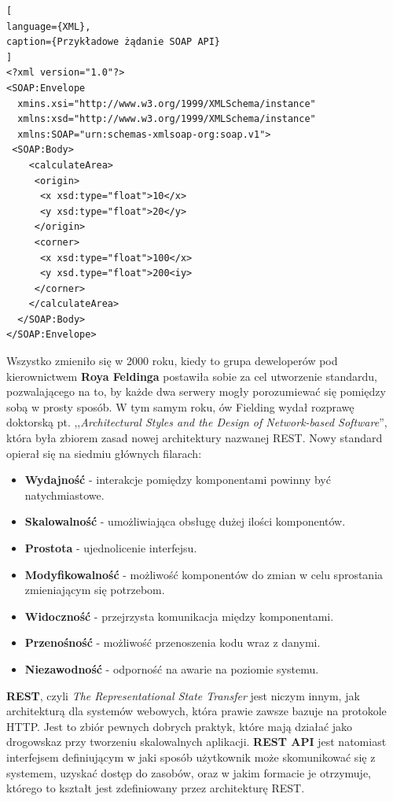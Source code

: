 \documentclass[oneside,polski,logo,indent]{amuthesis}
\begin{document}
\begin{lstlisting}[
language={XML},
caption={Przykładowe żądanie SOAP API}
]
<?xml version="1.0"?>
<SOAP:Envelope 
  xmins.xsi="http://www.w3.org/1999/XMLSchema/instance" 
  xmlns:xsd="http://www.w3.org/1999/XMLSchema/instance" 
  xmlns:SOAP="urn:schemas-xmlsoap-org:soap.v1">
 <SOAP:Body>
    <calculateArea>
     <origin>
      <x xsd:type="float">10</x>
      <y xsd:type="float">20</y>
     </origin>
     <corner>
      <x xsd:type="float">100</x>
      <y xsd.type="float">200<iy>
     </corner>
    </calculateArea>
  </SOAP:Body>
</SOAP:Envelope>
\end{lstlisting}


Wszystko zmieniło się w 2000 roku, kiedy to grupa deweloperów pod kierownictwem \textbf{Roya Feldinga} postawiła sobie za cel utworzenie standardu, pozwalającego na to, by każde dwa serwery mogły porozumiewać się pomiędzy sobą w prosty sposób. W tym samym roku, ów Fielding wydał rozprawę doktorską pt. ,,\emph{Architectural Styles and the Design of Network-based Software}'', która była zbiorem zasad nowej architektury nazwanej REST. Nowy standard opierał się na siedmiu głównych filarach:\newline 
\begin{itemize}
\item \textbf{Wydajność} - interakcje pomiędzy komponentami powinny być natychmiastowe.\newline
\item \textbf{Skalowalność} - umożliwiająca obsługę dużej ilości komponentów.\newline
\item \textbf{Prostota} - ujednolicenie interfejsu.\newline
\item \textbf{Modyfikowalność} - możliwość komponentów do zmian w celu sprostania zmieniającym się potrzebom.\newline
\item \textbf{Widoczność} - przejrzysta komunikacja między komponentami.\newline
\item \textbf{Przenośność} - możliwość przenoszenia kodu wraz z danymi.\newline
\item \textbf{Niezawodność} - odporność na awarie na poziomie systemu.\newline
\end{itemize}
\textbf{REST}, czyli \emph{The Representational State Transfer} jest niczym innym, jak architekturą dla systemów webowych, która prawie zawsze bazuje na protokole HTTP. Jest to zbiór pewnych dobrych praktyk, które mają działać jako drogowskaz przy tworzeniu skalowalnych aplikacji. \textbf{REST API} jest natomiast interfejsem definiującym w jaki sposób użytkownik może skomunikować się z systemem, uzyskać dostęp do zasobów, oraz w jakim formacie je otrzymuje, którego to kształt jest zdefiniowany przez architekturę REST. 
\end{document}
